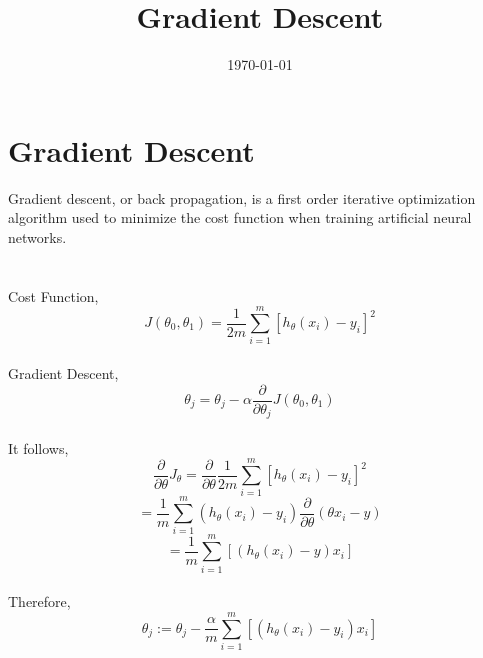 \documentclass[a4paper, 12pt]{article}
\begin{document}
\title{Gradient Descent}
\date{\today}
\section{Gradient Descent}
	Gradient descent, or back propagation, is a first order iterative optimization algorithm used to minimize the cost function when training artificial neural networks.\\
	\\
	\\
	Cost Function, $$J(\theta_0, \theta_1) = \frac{1}{2m} \sum_{i=1}^{m} [h_\theta (x_i) - y_i]^2 $$
	\\
	Gradient Descent,
	$$\theta_j = \theta_j - \alpha \frac{\partial}{\partial \theta_j} J(\theta_0, \theta_1)
	$$
	\\
	It follows,
	$$\frac{\partial}{\partial \theta} J_\theta = \frac{\partial}{\partial \theta} \frac{1}{2m} \sum_{i=1}^{m} [h_\theta (x_i) - y_i]^2
	$$
	$$= \frac{1}{m} \sum_{i=1}^{m} (h_\theta (x_i) - y_i) \frac{\partial}{\partial \theta} (\theta x_i - y)
	$$
	$$= \frac{1}{m} \sum_{i=1}^{m} [(h_\theta (x_i) - y) x_i]
	$$
	\\
	Therefore,
	$$ \theta_j := \theta_j - \frac{\alpha}{m} \sum_{i=1}^{m}[(h_\theta(x_i) - y_i) x_i]
	$$
\end{document}
